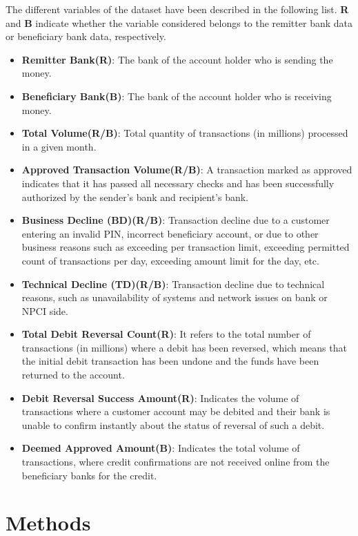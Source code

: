\documentclass{article}
\begin{document}
The different variables of the dataset have been described in the following list. \textbf{R} and \textbf{B} indicate whether the variable considered belongs to the remitter bank data or beneficiary bank data, respectively.

\begin{itemize}
    \item \textbf{Remitter Bank(R)}: The bank of the account holder who is sending the money.
    \item \textbf{Beneficiary Bank(B)}: The bank of the account holder who is receiving money.
    \item \textbf{Total Volume(R/B)}: Total quantity of transactions (in millions) processed in a given month.
    \item \textbf{Approved Transaction Volume(R/B)}: A transaction marked as approved indicates that it has passed all necessary checks and has been successfully authorized by the sender’s bank and recipient’s bank.
    \item \textbf{Business Decline (BD)(R/B)}: Transaction decline due to a customer entering an invalid PIN, incorrect beneficiary account, or due to other business reasons such as exceeding per transaction limit, exceeding permitted count of transactions per day, exceeding amount limit for the day, etc.
    \item \textbf{Technical Decline (TD)(R/B)}: Transaction decline due to technical reasons, such as unavailability of systems and network issues on bank or NPCI side.
    \item \textbf{Total Debit Reversal Count(R)}: It refers to the total number of transactions (in millions) where a debit has been reversed, which means that the initial debit transaction has been undone and the funds have been returned to the account.
    \item \textbf{Debit Reversal Success Amount(R)}: Indicates the volume of transactions where a customer account may be debited and their bank is unable to confirm instantly about the status of reversal of such a debit.
    \item \textbf{Deemed Approved Amount(B)}: Indicates the total volume of transactions, where credit confirmations are not received online from the beneficiary banks for the credit.
\end{itemize}


\section{Methods}
\end{document}
